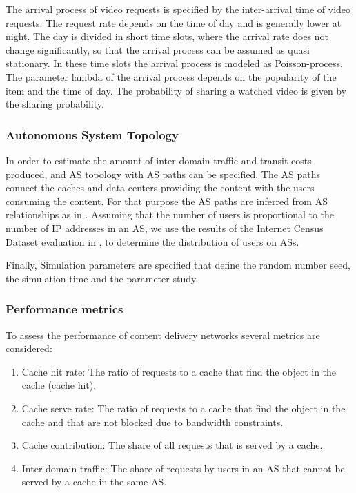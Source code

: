 The arrival process of video requests is specified by the inter-arrival time of video requests.
The request rate depends on the time of day and is generally lower at night.
The day is divided in short time slots, where the arrival rate does not change significantly, so that the arrival process can be assumed as quasi stationary.
In these time slots the arrival process is modeled as Poisson-process.
The parameter lambda of the arrival process depends on the popularity of the item and the time of day.
The probability of sharing a watched video is given by the sharing probability.

\subsubsection{Autonomous System Topology}
In order to estimate the amount of inter-domain traffic and transit costs produced, and AS topology with AS paths can be specified.
The AS paths connect the caches and data centers providing the content with the users consuming the content.
For that purpose the AS paths are inferred from AS relationships as in .
Assuming that the number of users is proportional to the number of IP addresses in an AS, we use the results of the Internet Census Dataset evaluation in , to determine the distribution of users on ASs.

Finally, Simulation parameters are specified that define the random number seed, the simulation time and the parameter study.

\subsubsection{Performance metrics}

To assess the performance of content delivery networks several metrics are considered:

\begin{enumerate}
\item Cache hit rate: The ratio of requests to a cache that find the object in the cache (cache hit).
\item Cache serve rate: The ratio of requests to a cache that find the object in the cache and that are not blocked due to bandwidth constraints.
\item Cache contribution: The share of all requests that is served by a cache.
\item Inter-domain traffic: The share of requests by users in an AS that cannot be served by a cache in the same AS.
\end{enumerate}

